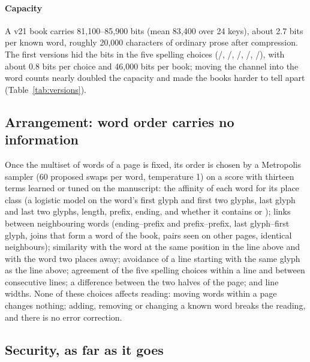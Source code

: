 \paragraph{Capacity} A v21 book carries 81{,}100--85{,}900 bits (mean 83{,}400 over 24 keys), about 2.7 bits per known
word, roughly 20{,}000 characters of ordinary prose after compression. The first versions hid the bits in the five
spelling choices (/, /, /, /, /), with
about 0.8 bits per choice and 46{,}000 bits per book; moving the channel into the word counts nearly doubled the capacity
and made the books harder to tell apart (Table~\ref{tab:versions}).

\subsection{Arrangement: word order carries no information}

Once the multiset of words of a page is fixed, its order is chosen by a Metropolis sampler (60 proposed swaps per word,
temperature 1) on a score with thirteen terms learned or tuned on the manuscript: the affinity of each word for its place
class (a logistic model on the word's first glyph and first two glyphs, last glyph and last two glyphs, length, prefix,
ending, and whether it contains  or ); links between neighbouring words
(ending--prefix and prefix--prefix, last glyph--first glyph, joins that form a word of the book, pairs seen on other
pages, identical neighbours); similarity with the word at the same position in the line above and with the word two
places away; avoidance of a line starting with the same glyph as the line above; agreement of the five spelling choices
within a line and between consecutive lines; a difference between the two halves of the page; and line widths. None of
these choices affects reading: moving words within a page changes nothing; adding, removing or changing a known word breaks
the reading, and there is no error correction.

\subsection{Security, as far as it goes}

